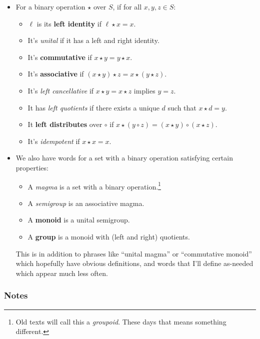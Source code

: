 \documentclass[11pt,paper=letter]{scrartcl}
\begin{document}
\vspace{-0.5em}
\begin{itemize}
\item For a binary operation $\star$ over $S$, if for all $x, y, z \in S$:
\begin{itemize}
\item $\ell$ is its \textbf{left identity} if $\ell \star x = x$.
\item It's \textit{unital} if it has a left and right identity.
\item It's \textbf{commutative} if $x \star y = y \star x$.
\item It's \textbf{associative} if $(x \star y) \star z = x \star (y \star z)$.
\item It's \textit{left cancellative} if $x \star y = x \star z$ implies $y = z$.
\item It has \textit{left quotients} if there exists a unique $d$ such that $x \star d = y$.
\item It \textbf{left distributes} over $\circ$ if $x \star (y \circ z) = (x \star y) \circ (x \star z)$.
\item It's \textit{idempotent} if $x \star x = x$.
\end{itemize}

\item We also have words for a set with a binary operation satisfying certain properties:
\begin{itemize}
\item A \textit{magma} is a set with a binary operation.\footnote{Old texts will call this a \textit{groupoid}. These days that means something different.}
\item A \textit{semigroup} is an associative magma.
\item A \textbf{monoid} is a unital semigroup.
\item A \textbf{group} is a monoid with (left and right) quotients.
\end{itemize}
This is in addition to phrases like ``unital magma'' or ``commutative monoid'' which hopefully have obvious definitions, and words that I'll define as-needed which appear much less often.
\end{itemize}

\subsubsection*{Notes}
\end{document}
